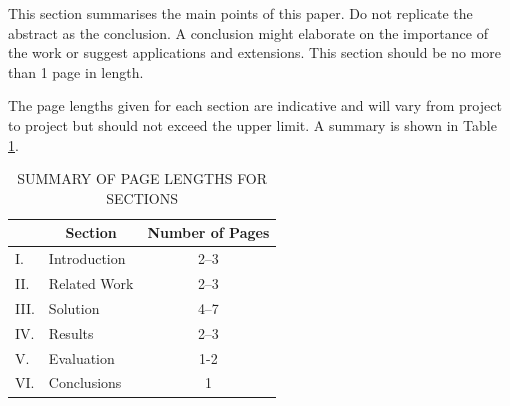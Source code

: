 \documentclass[12pt,a4paper]{article}
\begin{document}
This section summarises the main points of this paper.  Do not replicate the abstract as the conclusion.  A conclusion might elaborate on the importance of the work or suggest applications and extensions.  This section should be no more than 1 page in length.

The page lengths given for each section are indicative and will vary from project to project but should not exceed the upper limit.  A summary is shown in Table \ref{summary}.

\begin{table}[htb]
\centering
\caption{SUMMARY OF PAGE LENGTHS FOR SECTIONS}
\vspace*{6pt}
\label{summary}
\begin{tabular}{|ll|c|} \hline
& \multicolumn{1}{c|}{\bf Section} & {\bf Number of Pages} \\ \hline
I. & Introduction & 2--3 \\ \hline
II. & Related Work & 2--3 \\ \hline
III. & Solution & 4--7 \\ \hline
IV. & Results & 2--3 \\ \hline
V. & Evaluation & 1-2 \\ \hline
VI. & Conclusions & 1 \\ \hline
\end{tabular}
\end{table}



\end{document}
